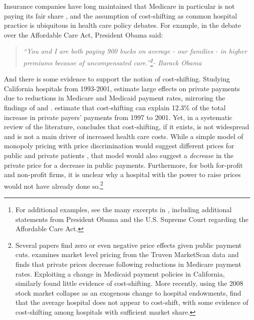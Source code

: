\documentclass[12pt]{article}
\begin{document}
Insurance companies have long maintained that Medicare in particular is not paying its fair share \citep{frakt2011}, and the assumption of cost-shifting as common hospital practice is ubiquitous in health care policy debates. For example, in the debate over the Affordable Care Act, President Obama said:
\begin{quote}
\textit{``You and I are both paying 900 bucks on average - our families - in higher premiums because of uncompensated care.''\footnote{For additional examples, see the many excerpts in \cite{dranove2017}, including additional statements from President Obama and the U.S. Supreme Court regarding the Affordable Care Act.}- Barack Obama}
\end{quote}
And there is some evidence to support the notion of cost-shifting. Studying California hospitals from 1993-2001, \cite{zwanziger2006} estimate large effects on private payments due to reductions in Medicare and Medicaid payment rates, mirroring the findings of \cite{lee2003} and \cite{zwanziger2000}. \cite{zwanziger2006} estimate that cost-shifting can explain 12.3\% of the total increase in private payers' payments from 1997 to 2001.  Yet, in a systematic review of the literature, \citet{frakt2011} concludes that cost-shifting, if it exists, is not widespread and is not a main driver of increased health care costs.   While a simple model of monopoly pricing with price discrimination would suggest different prices for public and private patients \citep{hay1983}, that model would also suggest a \textit{decrease} in the private price for a decrease in public payments.  Furthermore, for both for-profit and non-profit firms, it is unclear why a hospital with the power to raise prices would not have already done so.\footnote{Several papers find zero or even negative price effects given public payment cuts. \cite{white2013} examines market level pricing from the Truven MarketScan data and finds that private prices decrease following reductions in Medicare payment rates. Exploiting a change in Medicaid payment policies in California, \citet{dranove1998} similarly found little evidence of cost-shifting. More recently, using the 2008 stock market collapse as an exogenous change to hospital endowments, \cite{dranove2017} find that the average hospital does not appear to cost-shift, with some evidence of cost-shifting among hospitals with sufficient market share.}
\end{document}
